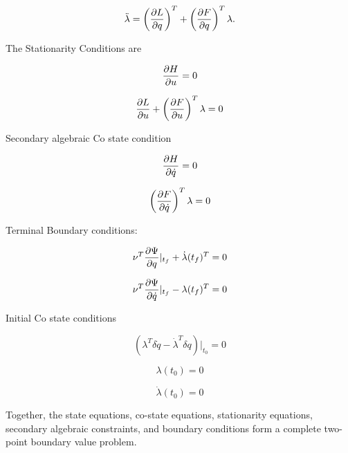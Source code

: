 \begin{equation}
    \ddot \lambda = \left( \frac{\partial L}{\partial q}  \right)^T + \left( \frac{\partial F}{\partial q} \right)^T \lambda .
\end{equation}

The Stationarity Conditions are

\begin{equation}
    \frac{\partial H}{\partial u} = 0
\end{equation}

\begin{equation}
    \frac{\partial L}{\partial u} + \left( \frac{\partial F}{\partial u} \right)^T \lambda = 0
\end{equation}



Secondary algebraic Co state condition

\begin{equation}
    \frac{\partial H}{\partial \dot q} = 0
\end{equation}

\begin{equation}
    \left(\frac{\partial F}{\partial \dot q}\right)^T \lambda = 0
\end{equation}


Terminal Boundary conditions:

\begin{equation}
    \nu^T \frac{\partial \Psi}{\partial q}|_{t_f} + \dot \lambda(t_f)^T = 0
\end{equation}

\begin{equation}
    \nu^T \frac{\partial \Psi}{\partial \dot q}|_{t_f} - \lambda(t_f)^T = 0
\end{equation}


Initial Co state conditions

\begin{equation}
    ( \lambda^T \delta \dot q - \dot \lambda^T \delta q )|_{t_0} = 0
\end{equation}

\begin{equation}
    \lambda(t_0) = 0
\end{equation}

\begin{equation}
    \label{initialcostateder}
    \dot \lambda(t_0) = 0
\end{equation}

Together, the state equations, co-state equations, stationarity equations, secondary algebraic constraints, and boundary conditions form a complete two-point boundary value problem.


